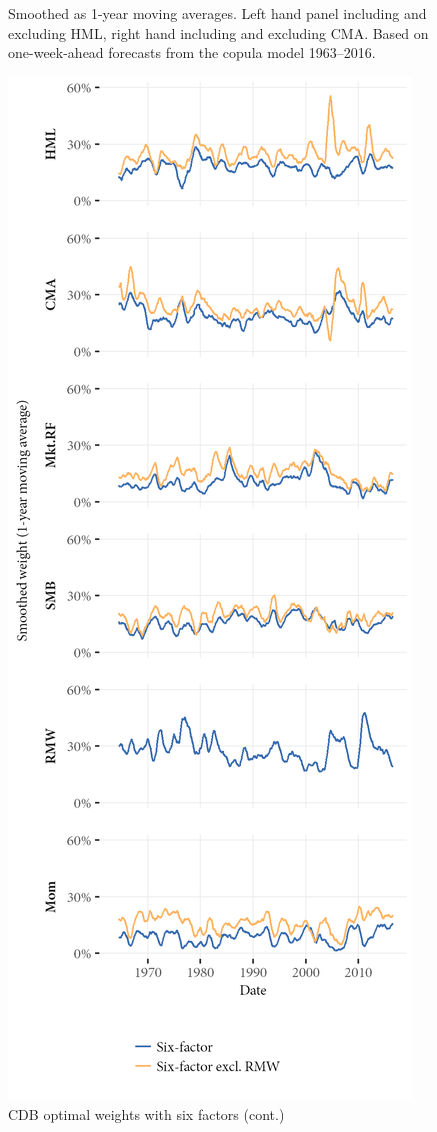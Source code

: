 \begin{figure}[htbp]
  \begin{longcaption}
    Smoothed as 1-year moving averages. Left hand panel including and excluding HML, right hand including and excluding CMA. Based on one-week-ahead forecasts from the copula model 1963--2016.
  \end{longcaption}
  \label{fig:cdb_optimal_6}
\end{figure}

\begin{figure}[htbp]
  \ContinuedFloat
  \centering
  \includegraphics[scale=1]{graphics/weights/appendix_Weights_CDB_6F_6F_EXCL_RMW.png}
  \footnotesize
  \caption{CDB optimal weights with six factors (cont.)}
\end{figure}

